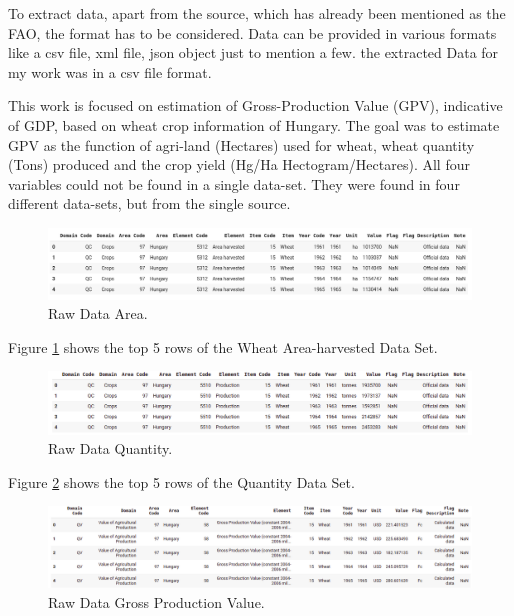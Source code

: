 To extract data, apart from the source, which has already been mentioned as the FAO, the format has to be considered. Data can be provided in various formats like a csv file, xml file, json object just to mention a few. the extracted Data for my work was in a csv file format. 

This work is focused on estimation of Gross-Production Value (GPV), indicative of GDP, based on wheat crop information of Hungary. The goal was to estimate GPV as the function of agri-land (Hectares) used for wheat, wheat quantity (Tons) produced and the crop yield (Hg/Ha Hectogram/Hectares). All four variables could not be found in a single data-set. They were found in four different data-sets, but from the single source.


\begin{figure}[h!]
	\includegraphics[width=\textwidth,height=\textheight,keepaspectratio]{fig/Area_Head.png}
	\caption{Raw Data Area.}
	\label{fig:Areaa_Head1}
\end{figure}

Figure \ref{fig:Areaa_Head1} shows the top 5 rows of the Wheat Area-harvested Data Set.

\begin{figure}[h!]
	\includegraphics[width=\textwidth,height=\textheight,keepaspectratio]{fig/Quantity_Head.png}
	\caption{Raw Data Quantity.}
	\label{fig:Quantity_Head}
\end{figure}

Figure \ref{fig:Quantity_Head} shows the top 5 rows of the Quantity Data Set.



\begin{figure}[h!]
	\includegraphics[width=\textwidth,height=\textheight,keepaspectratio]{fig/GPV_Head.png}
	\caption{Raw Data Gross Production Value.}
	\label{fig:GPV_Head}
\end{figure}

